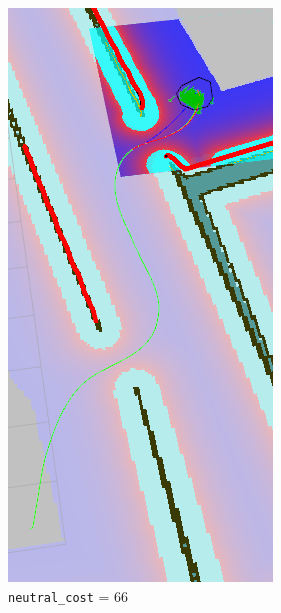 \documentclass[12pt]{article}
\begin{document}
\begin{figure}[!htb]
  \includegraphics[width=\linewidth]{NC_mid.png}
  \caption{\texttt{neutral\_cost} = 66}

\end{figure}
\end{document}
